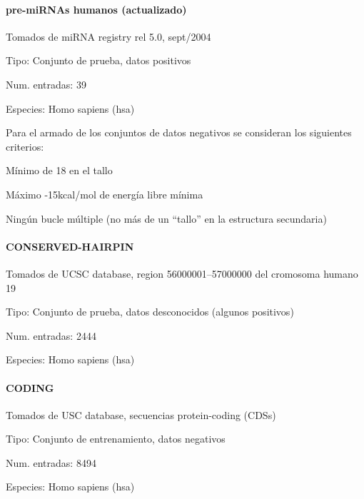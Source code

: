 \documentclass[12pt,bibliography=openstyle,DIV=12,parskip=half-]{scrartcl}
\begin{document}
\paragraph{pre-miRNAs humanos (actualizado)}
Tomados de miRNA registry rel 5.0, sept/2004
\begin{description*}
\item[Tipo:] Conjunto de prueba, datos positivos
\item[Num. entradas:] 39
\item[Especies:]  Homo sapiens (hsa)
\end{description*}

\bigskip
Para el armado de los conjuntos de datos negativos se consideran los
siguientes criterios:
\begin{itemize*}
\item Mínimo de 18  en el tallo
\item Máximo -15kcal/mol de energía libre mínima
\item Ningún bucle múltiple (no más de un ``tallo'' en la estructura
  secundaria)
\end{itemize*}

\paragraph{CONSERVED-HAIRPIN}
Tomados de UCSC database, region 56000001--57000000 del cromosoma
humano 19
\begin{description*}
\item[Tipo:] Conjunto de prueba, datos desconocidos (algunos
  positivos)
\item[Num. entradas:] 2444
\item[Especies:]  Homo sapiens (hsa)
\end{description*}
\paragraph{CODING}
Tomados de USC database, secuencias protein-coding (CDSs)
\begin{description*}
\item[Tipo:] Conjunto de entrenamiento, datos negativos
\item[Num. entradas:] 8494
\item[Especies:]  Homo sapiens (hsa)
\end{description*}
%
%
%
%
%
\end{document}

